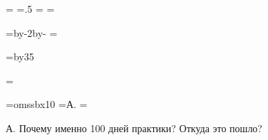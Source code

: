 \pdfpagewidth=297mm
\pdfpageheight=210mm
\pdfhorigin=1in
\pdfvorigin=0pt

\shhtotal=\pdfpagewidth
\htotal=.5\shhtotal
\vtotal=\pdfpageheight
\shoutline=0pt
\shstaplewidth=0pt
\shcrop=0pt
\shfootline={}
\shthickness=0pt

\horigin=10.8975mm
\hoffset=1cm
\hsize=\htotal \advance\hsize by-2\horigin \advance\hsize by-\hoffset
\output={\ifodd\pageno\else\hoffset=0pt\fi \plainoutput}

\vorigin=10mm
\vsize=\topskip \advance\vsize by35\baselineskip

\footline={\line{\hss\tenrm\folio\hss}}

\font\speakerF=omssbx10
\def\A{\item{\speakerF А.}} %
\def\T{\item{\speakerF У.}} %
=\hbox{\speakerF А.\enskip}
\parindent=

\A
Почему именно 100 дней практики? Откуда это пошло?

